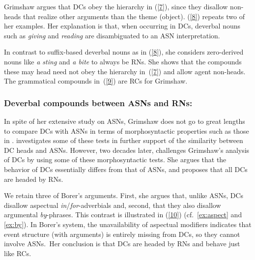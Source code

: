 \documentclass[output=paper]{langsci/langscibook}
\begin{document}
\begin{exe}
\end{exe}

Grimshaw argues that DCs obey the hierarchy in (\ref{7}), since they disallow non-heads that realize other arguments than the theme (object). (\ref{8}) repeats two of her examples. Her explanation is that, when occurring in DCs, deverbal nouns such as  \textit{giving} and \textit{reading} are disambiguated to an ASN interpretation. 
\begin{exe}
\end{exe}
In contrast to suffix-based deverbal nouns as in (\ref{8}), she considers zero-derived nouns like \textit{a sting} and \textit{a bite} to always be RNs. She shows that the compounds these may head need not obey the hierarchy in~(\ref{7}) and allow agent non-heads. The grammatical compounds in~(\ref{9}) are RCs for Grimshaw. 
\begin{exe}
\end{exe}

\subsubsection{Deverbal compounds between ASNs and RNs: \cite{borer:13}}
In spite of her extensive study on ASNs, Grimshaw does not go to great lengths to compare DCs with ASNs in terms of  morphosyntactic properties such as those in . \cite{disciullo:92} investigates some of these tests in further support of the similarity between DC heads and ASNs. However, two decades later, \cite{borer:13} challenges Grimshaw's analysis of DCs by using some of these morphosyntactic tests. She argues that the behavior of DCs essentially differs from that of ASNs, and proposes that all DCs are headed by RNs.

We retain three of Borer's arguments.
First, she argues that, unlike ASNs, DCs disallow aspectual \textit{in}/\textit{for}-adverbials and, second, that they also disallow argumental \textit{by}-phrases.
This contrast is illustrated in (\ref{10})  {(cf.\ \ref{ex:aspect} and \ref{ex:by})}.
In Borer's system, the unavailability of aspectual modifiers indicates that event structure (with arguments) is entirely missing from DCs, so they cannot involve ASNs.\ Her conclusion is that DCs are headed by RNs and behave just like RCs. 
\end{document}
